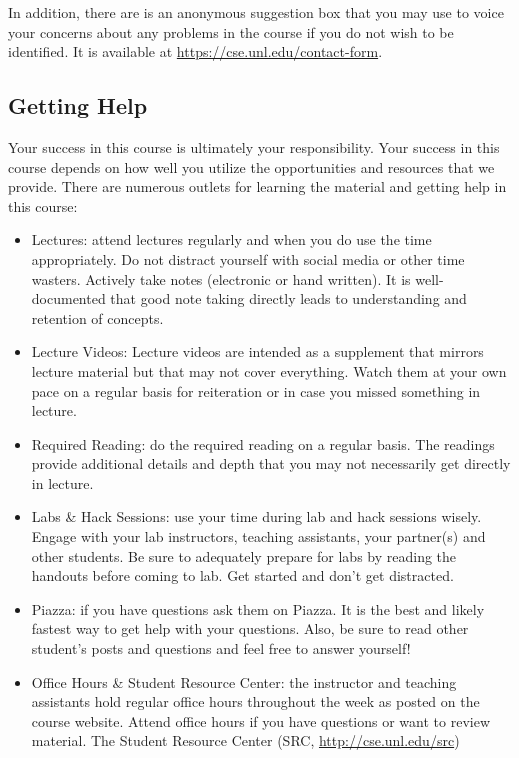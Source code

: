 \documentclass[12pt]{scrartcl}
\begin{document}
In addition, there are is an anonymous suggestion box that you may 
use to voice your concerns about any problems in the course if you 
do not wish to be identified. It is available at 
\url{https://cse.unl.edu/contact-form}.

\subsection{Getting Help}

Your success in this course is ultimately your responsibility.  Your
success in this course depends on how well you utilize the opportunities
and resources that we provide.  There are numerous outlets for learning
the material and getting help in this course:
\begin{itemize}
  \item Lectures: attend lectures regularly and when you do use the 
  time appropriately.  Do not distract yourself with social media or other
  time wasters.  Actively take notes (electronic or hand written).  It is
  well-documented that good note taking directly leads to understanding and
  retention of concepts.
  \item Lecture Videos: Lecture videos are intended as a supplement
  that mirrors lecture material but that may not cover everything.  Watch
  them at your own pace on a regular basis for reiteration or in case
  you missed something in lecture.  
  \item Required Reading: do the required reading on a regular basis.  The
  readings provide additional details and depth that you may not necessarily
  get directly in lecture.  
  \item Labs \& Hack Sessions: use your time during lab and hack sessions 
  wisely.  Engage with your lab instructors, teaching assistants, your partner(s)
  and other students.  Be sure to adequately prepare for labs by reading
  the handouts before coming to lab.  Get started and don't get distracted.
  \item Piazza: if you have questions ask them on Piazza.  It is the best and
  likely fastest way to get help with your questions.  Also, be sure to read
  other student's posts and questions and feel free to answer yourself!
  \item Office Hours \& Student Resource Center: the instructor and teaching
  assistants hold regular office hours throughout the week as posted on the
  course website.  Attend office hours if you have questions or want to 
  review material.  The Student Resource Center (SRC, \url{http://cse.unl.edu/src})

\end{itemize}
\end{document}

